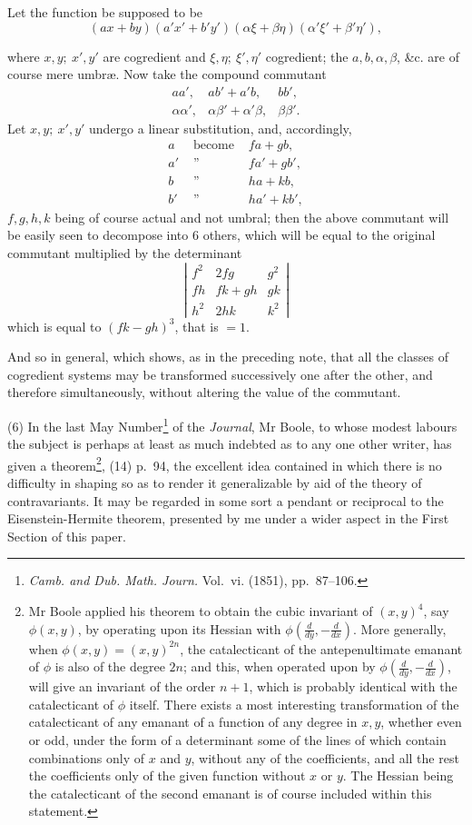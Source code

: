 \documentclass[11pt]{article}
\newcommand{\sourcepage}[1]{\marginpar{\scriptsize p.~#1}}
\begin{document}
{{Let the function be supposed to be
\[
(ax+by)(a'x'+b'y')(\alpha\xi+\beta\eta)(\alpha'\xi'+\beta'\eta'),
\]

\sourcepage{325}
where $x,y;\ x',y'$ are cogredient and $\xi,\eta;\ \xi',\eta'$ cogredient; the $a,b,\alpha,\beta$, \&c. are of course mere umbræ. Now take the compound commutant
\[
\begin{array}{ccc}
aa',&ab'+a'b,&bb',\\
\alpha\alpha',&\alpha\beta'+\alpha'\beta,&\beta\beta'.
\end{array}
\]
Let $x,y;\ x',y'$ undergo a linear substitution, and, accordingly,
\[
\begin{array}{rcl}
a&\text{ become }&fa+gb,\\
a'&\text{ '' }&fa'+gb',\\
b&\text{ '' }&ha+kb,\\
b'&\text{ '' }&ha'+kb',
\end{array}
\]
$f,g,h,k$ being of course actual and not umbral; then the above commutant will be easily seen to decompose into 6 others, which will be equal to the original commutant multiplied by the determinant
\[
\left|\begin{array}{ccc}
f^2&2fg&g^2\\
fh&fk+gh&gk\\
h^2&2hk&k^2
\end{array}\right|
\]
which is equal to $(fk-gh)^3$, that is $=1$.

And so in general, which shows, as in the preceding note, that all the classes of cogredient systems may be transformed successively one after the other, and therefore simultaneously, without altering the value of the commutant.

(6) In the last May Number\footnote{\emph{Camb. and Dub. Math. Journ.} Vol.~vi. (1851), pp.~87--106.} of the \emph{Journal}, Mr Boole, to whose modest labours the subject is perhaps at least as much indebted as to any one other writer, has given a theorem\footnote{Mr Boole applied his theorem to obtain the cubic invariant of $(x,y)^4$, say $\phi(x,y)$, by operating upon its Hessian with $\phi\left(\frac{d}{dy},-\frac{d}{dx}\right)$. More generally, when $\phi(x,y)=(x,y)^{2n}$, the catalecticant of the antepenultimate emanant of $\phi$ is also of the degree $2n$; and this, when operated upon by $\phi\left(\frac{d}{dy},-\frac{d}{dx}\right)$, will give an invariant of the order $n+1$, which is probably identical with the catalecticant of $\phi$ itself. There exists a most interesting transformation of the catalecticant of any emanant of a function of any degree in $x,y$, whether even or odd, under the form of a determinant some of the lines of which contain combinations only of $x$ and $y$, without any of the coefficients, and all the rest the coefficients only of the given function without $x$ or $y$. The Hessian being the catalecticant of the second emanant is of course included within this statement.}, (14) p.~94, the excellent idea contained in which there is no difficulty in shaping so as to render it generalizable by aid of the theory of contravariants. It may be regarded in some sort a pendant or reciprocal to the Eisenstein-Hermite theorem, presented by me under a wider aspect in the First Section of this paper.

}}
\end{document}
